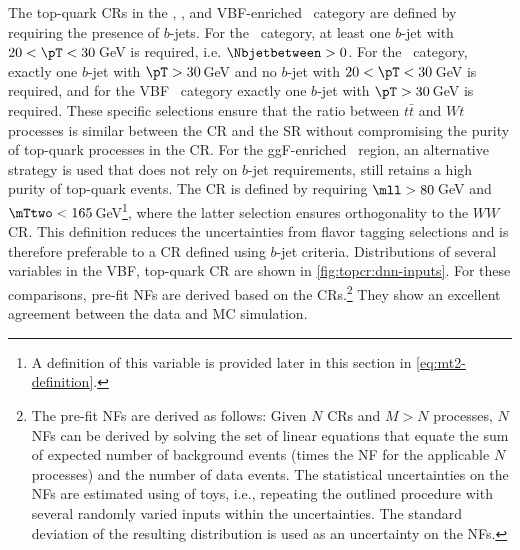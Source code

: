 The top-quark CRs in the \ZeroJet, \OneJet, and VBF-enriched \TwoJet\ category are defined by requiring the presence of $b$-jets.
For the \ZeroJet\ category, at least one $b$-jet with $20 < \pT < 30\,$GeV is required, i.e.  $\Nbjetbetween > 0$.
For the \OneJet\ category, exactly one $b$-jet with $\pT > 30\,$GeV and no $b$-jet with $20 < \pT < 30\,$GeV is required, and for the VBF \TwoJet\ category exactly one $b$-jet with $\pT > 30\,$GeV is required.
These specific selections ensure that the ratio between $t\bar{t}$ and $Wt$ processes is similar between the CR and the SR without compromising the purity of top-quark processes in the CR.
For the ggF-enriched \TwoJet\ region, an alternative strategy is used that does not rely on $b$-jet requirements, still retains a high purity of top-quark events. The CR is defined by requiring $\mll > 80\,$GeV and $\mTtwo < 165\,$GeV\footnote{A definition of this variable is provided later in this section in \cref{eq:mt2-definition}.}, where the latter selection ensures orthogonality to the $WW$ CR. This definition reduces the uncertainties from flavor tagging selections and is therefore preferable to a CR defined using $b$-jet criteria.
Distributions of several variables in the VBF, top-quark CR are shown in \cref{fig:topcr:dnn-inputs}.
For these comparisons, pre-fit NFs are derived based on the CRs.\footnote{The pre-fit NFs are derived as follows: Given $N$ CRs and $M > N$ processes, $N$ NFs can be derived by solving the set of linear equations that equate the sum of expected number of background events (times the NF for the applicable $N$ processes) and the number of data events. The statistical uncertainties on the NFs are estimated using of toys, i.e., repeating the outlined procedure with several randomly varied inputs within the uncertainties. The standard deviation of the resulting distribution is used as an uncertainty on the NFs.}
They show an excellent agreement between the data and MC simulation.

